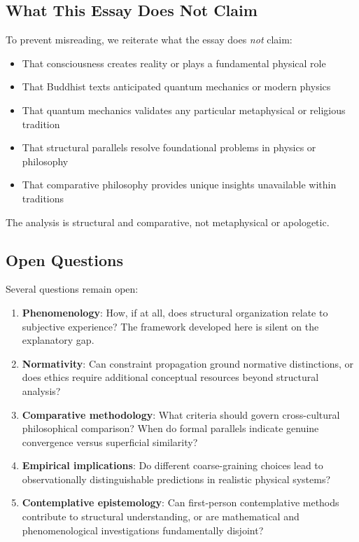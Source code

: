 \documentclass[12pt,a4paper,openany]{book}
\begin{document}
\subsection{What This Essay Does Not Claim}

To prevent misreading, we reiterate what the essay does \emph{not} claim:

\begin{itemize}
\item That consciousness creates reality or plays a fundamental physical role
\item That Buddhist texts anticipated quantum mechanics or modern physics
\item That quantum mechanics validates any particular metaphysical or religious tradition
\item That structural parallels resolve foundational problems in physics or philosophy
\item That comparative philosophy provides unique insights unavailable within traditions
\end{itemize}

The analysis is structural and comparative, not metaphysical or apologetic.

\subsection{Open Questions}

Several questions remain open:

\begin{enumerate}
\item \textbf{Phenomenology}: How, if at all, does structural organization relate to subjective experience? The framework developed here is silent on the explanatory gap.

\item \textbf{Normativity}: Can constraint propagation ground normative distinctions, or does ethics require additional conceptual resources beyond structural analysis?

\item \textbf{Comparative methodology}: What criteria should govern cross-cultural philosophical comparison? When do formal parallels indicate genuine convergence versus superficial similarity?

\item \textbf{Empirical implications}: Do different coarse-graining choices lead to observationally distinguishable predictions in realistic physical systems?

\item \textbf{Contemplative epistemology}: Can first-person contemplative methods contribute to structural understanding, or are mathematical and phenomenological investigations fundamentally disjoint?
\end{enumerate}
\end{document}
